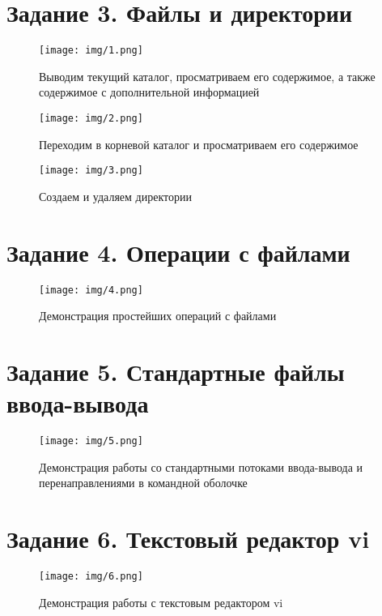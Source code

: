 \documentclass{gost}
\begin{document}
	\gostTitlePage

	\section{Задание 3. Файлы и директории}
		\begin{figure}[H]
			\texttt{[image: img/1.png]}
			\caption{Выводим текущий каталог, просматриваем его содержимое, а также
			содержимое с дополнительной информацией}
		\end{figure}

		\begin{figure}[H]
			\texttt{[image: img/2.png]}
			\caption{Переходим в корневой каталог и просматриваем его содержимое}
		\end{figure}

		\begin{figure}[H]
			\texttt{[image: img/3.png]}
			\caption{Создаем и удаляем директории}
		\end{figure}
		
	\section{Задание 4. Операции с файлами}
		\begin{figure}[H]
			\texttt{[image: img/4.png]}
			\caption{Демонстрация простейших операций с файлами}
		\end{figure}

	\section{Задание 5. Стандартные файлы ввода-вывода}
		\begin{figure}[H]
			\texttt{[image: img/5.png]}
			\caption{Демонстрация работы со стандартными потоками ввода-вывода и
			перенаправлениями в командной оболочке}
		\end{figure}

	\section{Задание 6. Текстовый редактор vi}
		\begin{figure}[H]
			\texttt{[image: img/6.png]}
			\caption{Демонстрация работы с текстовым редактором vi}
		\end{figure}
\end{document}
